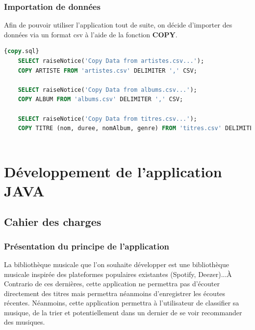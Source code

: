 \documentclass[a4paper,12pt, french]{report}
\begin{document}
\subsection{Importation de données}
Afin de pouvoir utiliser l'application tout de suite, on décide d'importer des données via un format csv à l'aide de la fonction \textbf{COPY}.
	\begin{lstlisting}[language=SQL, label=data-coy,caption=Copie des données, breaklines, frame=single]{copy.sql}
	SELECT raiseNotice('Copy Data from artistes.csv...');
	COPY ARTISTE FROM 'artistes.csv' DELIMITER ',' CSV;
	
	SELECT raiseNotice('Copy Data from albums.csv...');
	COPY ALBUM FROM 'albums.csv' DELIMITER ',' CSV;
	
	SELECT raiseNotice('Copy Data from titres.csv...');
	COPY TITRE (nom, duree, nomAlbum, genre) FROM 'titres.csv' DELIMITER ',' CSV;
	
     \end{lstlisting}


\chapter{Développement de l'application JAVA}
\section{Cahier des charges}
  \subsection{Présentation du principe de l'application}
    La bibliothèque musicale que l'on souhaite développer est une bibliothèque musicale inspirée des plateformes populaires existantes (Spotify, Deezer)...À Contrario de ces dernières, cette application ne permettra pas d'écouter directement des titres mais permettra néanmoins d'enregistrer les écoutes récentes. Néanmoins, cette application permettra à l'utilisateur de classifier sa musique, de la trier et potentiellement dans un dernier de se voir recommander des musiques.
\end{document}
